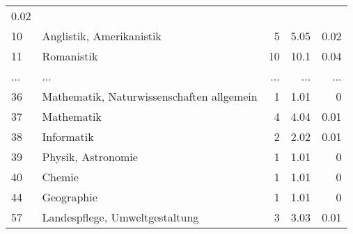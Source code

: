\begin{longtable}{lXrrr}
          \num[round-mode=places,round-precision=2]{0,02} \\
        10 & \multicolumn{1}{X}{Anglistik, Amerikanistik} & %
          \num{5} &
          \num[round-mode=places,round-precision=2]{5,05} &
          \num[round-mode=places,round-precision=2]{0,02} \\
        11 & \multicolumn{1}{X}{Romanistik} & %
          \num{10} &
          \num[round-mode=places,round-precision=2]{10,1} &
          \num[round-mode=places,round-precision=2]{0,04} \\
       ... & ... & ... & ... & ... \\
        36 & \multicolumn{1}{X}{Mathematik, Naturwissenschaften allgemein} & %
          \num{1} &
          \num[round-mode=places,round-precision=2]{1,01} &
          \num[round-mode=places,round-precision=2]{0} \\

        37 & \multicolumn{1}{X}{Mathematik} & %
          \num{4} &
          \num[round-mode=places,round-precision=2]{4,04} &
          \num[round-mode=places,round-precision=2]{0,01} \\

        38 & \multicolumn{1}{X}{Informatik} & %
          \num{2} &
          \num[round-mode=places,round-precision=2]{2,02} &
          \num[round-mode=places,round-precision=2]{0,01} \\

        39 & \multicolumn{1}{X}{Physik, Astronomie} & %
          \num{1} &
          \num[round-mode=places,round-precision=2]{1,01} &
          \num[round-mode=places,round-precision=2]{0} \\

        40 & \multicolumn{1}{X}{Chemie} & %
          \num{1} &
          \num[round-mode=places,round-precision=2]{1,01} &
          \num[round-mode=places,round-precision=2]{0} \\

        44 & \multicolumn{1}{X}{Geographie} & %
          \num{1} &
          \num[round-mode=places,round-precision=2]{1,01} &
          \num[round-mode=places,round-precision=2]{0} \\

        57 & \multicolumn{1}{X}{Landespflege, Umweltgestaltung} & %
          \num{3} &
          \num[round-mode=places,round-precision=2]{3,03} &
          \num[round-mode=places,round-precision=2]{0,01} \\


\end{longtable}
